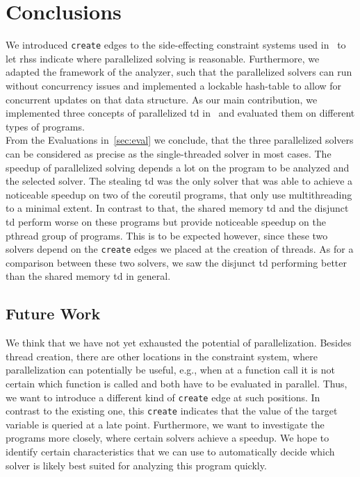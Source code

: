 \section{Conclusions}
\label{sec:conclusions}
We introduced \texttt{create} edges to the side-effecting constraint systems used in \gob\ to let \acp{rhs} indicate where parallelized solving is reasonable. Furthermore, we adapted the framework of the analyzer, such that the parallelized solvers can run without concurrency issues and implemented a lockable hash-table to allow for concurrent updates on that data structure. As our main contribution, we implemented three concepts of parallelized \acl{td} in \gob\ and evaluated them on different types of programs.\\
From the Evaluations in~\autoref{sec:eval} we conclude, that the three parallelized solvers can be considered as precise as the single-threaded solver in most cases. The speedup of parallelized solving depends a lot on the program to be analyzed and the selected solver. The stealing \ac{td} was the only solver that was able to achieve a noticeable speedup on two of the coreutil programs, that only use multithreading to a minimal extent. In contrast to that, the shared memory \ac{td} and the disjunct \ac{td} perform worse on these programs but provide noticeable speedup on the pthread group of programs. This is to be expected however, since these two solvers depend on the \texttt{create} edges we placed at the creation of threads. As for a comparison between these two solvers, we saw the disjunct \ac{td} performing better than the shared memory \ac{td} in general.

  \label{sec:conclusions:futureWork} 
  \subsection{Future Work}
  We think that we have not yet exhausted the potential of parallelization. Besides thread creation, there are other locations in the constraint system, where parallelization can potentially be useful, e.g., when at a function call it is not certain which function is called and both have to be evaluated in parallel. Thus, we want to introduce a different kind of \texttt{create} edge at such positions. In contrast to the existing one, this \texttt{create} indicates that the value of the target variable is queried at a late point.
  Furthermore, we want to investigate the programs more closely, where certain solvers achieve a speedup. We hope to identify certain characteristics that we can use to automatically decide which solver is likely best suited for analyzing this program quickly.